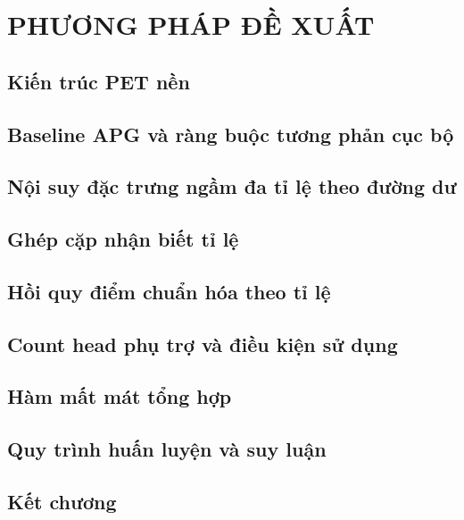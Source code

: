 \chapter{PHƯƠNG PHÁP ĐỀ XUẤT}
\label{chap:method}

\section{Kiến trúc PET nền}
\section{Baseline APG và ràng buộc tương phản cục bộ}
\section{Nội suy đặc trưng ngầm đa tỉ lệ theo đường dư}
\section{Ghép cặp nhận biết tỉ lệ}
\section{Hồi quy điểm chuẩn hóa theo tỉ lệ}
\section{Count head phụ trợ và điều kiện sử dụng}
\section{Hàm mất mát tổng hợp}
\section{Quy trình huấn luyện và suy luận}
\section{Kết chương}
